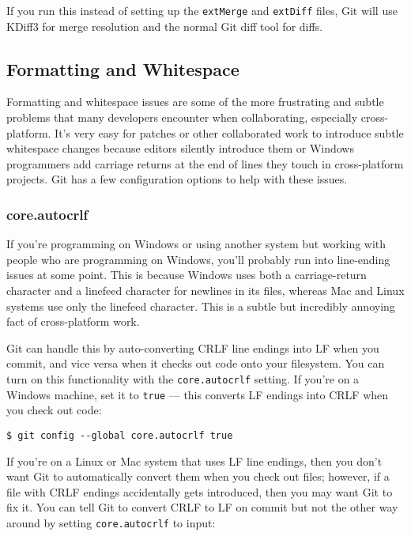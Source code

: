\documentclass[a4paper]{book}
\begin{document}
If you run this instead of setting up the \texttt{extMerge} and \texttt{extDiff} files, Git will use KDiff3 for merge resolution and the normal Git diff tool for diffs.

\subsection{Formatting and Whitespace}\label{formatting-and-whitespace}

Formatting and whitespace issues are some of the more frustrating and subtle problems that many developers encounter when collaborating, especially cross-platform. It's very easy for patches or other collaborated work to introduce subtle whitespace changes because editors silently introduce them or Windows programmers add carriage returns at the end of lines they touch in cross-platform projects. Git has a few configuration options to help with these issues.

\subsubsection{core.autocrlf}

If you're programming on Windows or using another system but working with people who are programming on Windows, you'll probably run into line-ending issues at some point. This is because Windows uses both a carriage-return character and a linefeed character for newlines in its files, whereas Mac and Linux systems use only the linefeed character. This is a subtle but incredibly annoying fact of cross-platform work.

Git can handle this by auto-converting CRLF line endings into LF when you commit, and vice versa when it checks out code onto your filesystem. You can turn on this functionality with the \texttt{core.autocrlf} setting. If you're on a Windows machine, set it to \texttt{true} --- this converts LF endings into CRLF when you check out code:

\begin{shaded}\begin{verbatim}
$ git config --global core.autocrlf true
\end{verbatim}\end{shaded}

If you're on a Linux or Mac system that uses LF line endings, then you don't want Git to automatically convert them when you check out files; however, if a file with CRLF endings accidentally gets introduced, then you may want Git to fix it. You can tell Git to convert CRLF to LF on commit but not the other way around by setting \texttt{core.autocrlf} to input:
\end{document}
